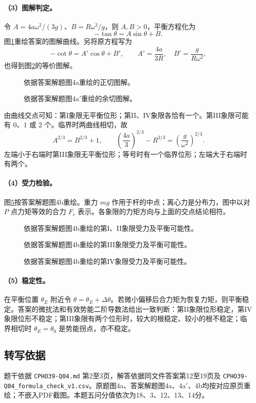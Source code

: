 \paragraph{（3）图解判定。}
令 $A=4a\omega^2/(3g)$、$B=R\omega^2/g$，则 $A,B>0$，平衡方程化为
\[-\tan\theta=A\sin\theta+B.\]
图\ref{fig:cpho39q04tan}重绘答案的图解曲线。另将原方程写为
\[-\cot\theta=A'\cos\theta+B',\qquad A'=\frac{4a}{3R},\quad B'=\frac{g}{R\omega^2},\]
也得到图\ref{fig:cpho39q04cot}的等价图解。
\begin{figure}[htbp]\centering
  
  \caption{依据答案解题图4a重绘的正切图解。}\label{fig:cpho39q04tan}
\end{figure}
\begin{figure}[htbp]\centering
  
  \caption{依据答案解题图4a$'$重绘的余切图解。}\label{fig:cpho39q04cot}
\end{figure}
由曲线交点可知：第I象限无平衡位形；第II、IV象限各恰有一个。第III象限可能有 $0$、$1$ 或 $2$ 个。临界时两曲线相切，故
\[
A^{2/3}=B^{2/3}+1,
\qquad
\boxed{\left(\frac{4a}{3}\right)^{2/3}-R^{2/3}=\left(\frac{g}{\omega^2}\right)^{2/3}.}
\]
左端小于右端时第III象限无平衡位形；等号时有一个临界位形；左端大于右端时有两个。

\paragraph{（4）受力检验。}
图\ref{fig:cpho39q04forces}按答案解题图4b重绘。重力 $mg$ 作用于杆的中点；离心力是分布力，图中以对 $P$ 点力矩等效的合力 $F_c$ 表示。各象限的力矩方向与上面的交点结论相符。
\begin{figure}[htbp]\centering
  
  \caption{依据答案解题图4b重绘的第I、II象限受力及平衡可能性。}\label{fig:cpho39q04forcesupper}
\end{figure}
\begin{figure}[htbp]\centering
  
  \caption{依据答案解题图4b重绘的第III象限受力及平衡可能性。}\label{fig:cpho39q04forcesiii}
\end{figure}
\begin{figure}[htbp]\centering
  
  \caption{依据答案解题图4b重绘的第IV象限受力及平衡可能性。}\label{fig:cpho39q04forces}
\end{figure}

\paragraph{（5）稳定性。}
在平衡位置 $\theta_E$ 附近令 $\theta=\theta_E+\Delta\theta$。若微小偏移后合力矩为恢复力矩，则平衡稳定。答案的微扰法和有效势能二阶导数法给出一致判断：第II象限位形稳定，第IV象限位形不稳定；第III象限有两个位形时，较大的根稳定、较小的根不稳定；临界相切时 $\theta_E=\theta_0$ 是势能拐点，亦不稳定。

\subsection{转写依据}
题干依据 \texttt{CPHO39-Q04.md} 第2至3页，解答依据同文件答案第12至19页及 \texttt{CPHO39-Q04\_formula\_check\_v1.csv}。原题图4a、答案解题图4a、4a$'$、4b均按对应原页重绘；不嵌入PDF截图。本题五问分值依次为18、3、12、13、14分。
